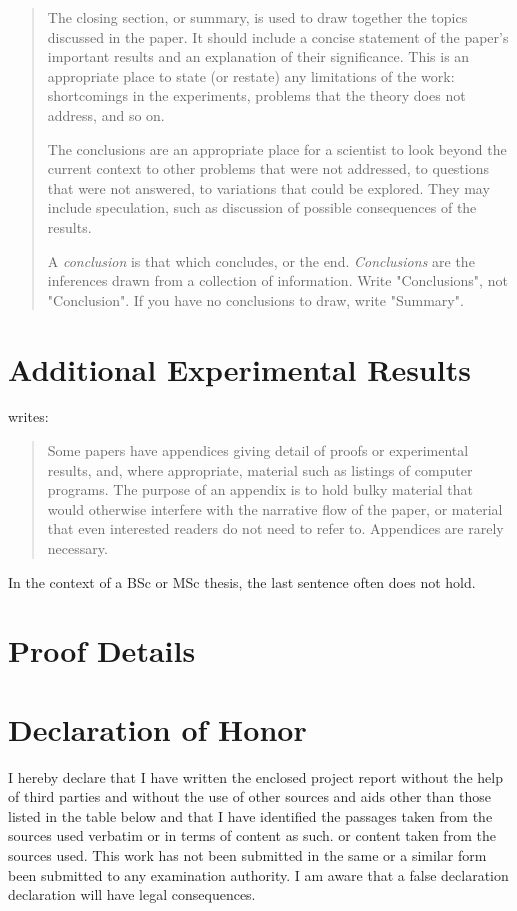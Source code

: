 \documentclass[a4paper,oneside,bibliography=totoc]{scrartcl}
\begin{document}
\blockcquote{zobel2004}{%
  The closing section, or summary, is used to draw together the topics discussed
  in the paper. It should include a concise statement of the paper's important
  results and an explanation of their significance. This is an appropriate place
  to state (or restate) any limitations of the work: shortcomings in the
  experiments, problems that the theory does not address, and so on.

  The conclusions are an appropriate place for a scientist to look beyond the
  current context to other problems that were not addressed, to questions that
  were not answered, to variations that could be explored. They may include
  speculation, such as discussion of possible consequences of the results.

  A \emph{conclusion} is that which concludes, or the end. \emph{Conclusions}
  are the inferences drawn from a collection of information. Write
  "Conclusions", not "Conclusion". If you have no conclusions to draw, write
  "Summary".}




\appendix
\section{Additional Experimental Results}

\citet{zobel2004} writes:

\blockcquote{zobel2004}{%
  Some papers have appendices giving detail of proofs or experimental results,
  and, where appropriate, material such as listings of computer programs. The
  purpose of an appendix is to hold bulky material that would otherwise
  interfere with the narrative flow of the paper, or material that even
  interested readers do not need to refer to. Appendices are rarely necessary.}

In the context of a BSc or MSc thesis, the last sentence often does not hold.

\section{Proof Details}


\clearpage
\section*{Declaration of Honor}

I hereby declare that I have written the enclosed 
project report without the help of third parties and without the use of other
sources and aids other than those listed in the table below
and that I have identified the passages taken from the sources used verbatim or in terms of content as such.
or content taken from the sources used. This work has not been submitted in the same or a similar form
been submitted to any examination authority. I am aware that a false declaration
declaration will have legal consequences.
\end{document}

